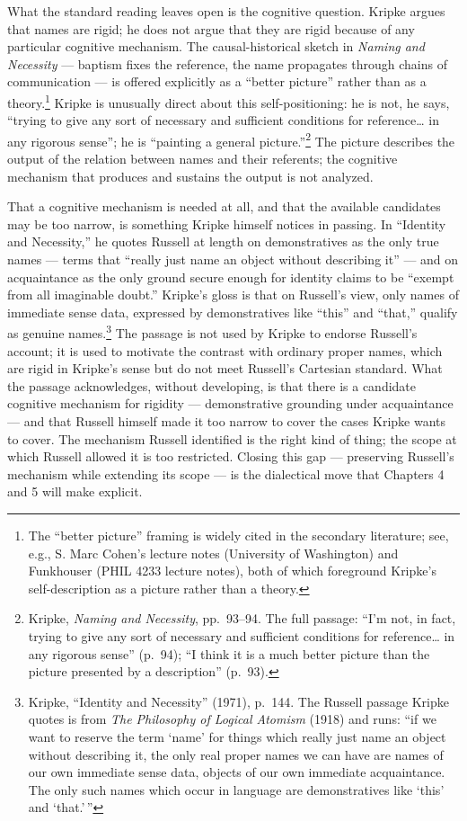 \documentclass[10pt]{article}
\begin{document}
What the standard reading leaves open is the cognitive question. Kripke argues that names are rigid; he does not argue that they are rigid because of any particular cognitive mechanism. The causal-historical sketch in \emph{Naming and Necessity} --- baptism fixes the reference, the name propagates through chains of communication --- is offered explicitly as a ``better picture'' rather than as a theory.\footnote{The ``better picture'' framing is widely cited in the secondary literature; see, e.g., S. Marc Cohen's lecture notes (University of Washington) and Funkhouser (PHIL 4233 lecture notes), both of which foreground Kripke's self-description as a picture rather than a theory.} Kripke is unusually direct about this self-positioning: he is not, he says, ``trying to give any sort of necessary and sufficient conditions for reference\ldots{} in any rigorous sense''; he is ``painting a general picture.''\footnote{Kripke, \emph{Naming and Necessity}, pp.~93--94. The full passage: ``I'm not, in fact, trying to give any sort of necessary and sufficient conditions for reference\ldots{} in any rigorous sense'' (p.~94); ``I think it is a much better picture than the picture presented by a description'' (p.~93).} The picture describes the output of the relation between names and their referents; the cognitive mechanism that produces and sustains the output is not analyzed.

That a cognitive mechanism is needed at all, and that the available candidates may be too narrow, is something Kripke himself notices in passing. In ``Identity and Necessity,'' he quotes Russell at length on demonstratives as the only true names --- terms that ``really just name an object without describing it'' --- and on acquaintance as the only ground secure enough for identity claims to be ``exempt from all imaginable doubt.'' Kripke's gloss is that on Russell's view, only names of immediate sense data, expressed by demonstratives like ``this'' and ``that,'' qualify as genuine names.\footnote{Kripke, ``Identity and Necessity'' (1971), p.~144. The Russell passage Kripke quotes is from \emph{The Philosophy of Logical Atomism} (1918) and runs: ``if we want to reserve the term `name' for things which really just name an object without describing it, the only real proper names we can have are names of our own immediate sense data, objects of our own immediate acquaintance. The only such names which occur in language are demonstratives like `this' and `that.'\,''} The passage is not used by Kripke to endorse Russell's account; it is used to motivate the contrast with ordinary proper names, which are rigid in Kripke's sense but do not meet Russell's Cartesian standard. What the passage acknowledges, without developing, is that there is a candidate cognitive mechanism for rigidity --- demonstrative grounding under acquaintance --- and that Russell himself made it too narrow to cover the cases Kripke wants to cover. The mechanism Russell identified is the right kind of thing; the scope at which Russell allowed it is too restricted. Closing this gap --- preserving Russell's mechanism while extending its scope --- is the dialectical move that Chapters 4 and 5 will make explicit.
\end{document}
